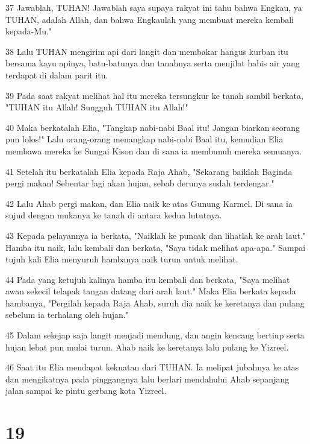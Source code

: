 \par 37 Jawablah, TUHAN! Jawablah saya supaya rakyat ini tahu bahwa Engkau, ya TUHAN, adalah Allah, dan bahwa Engkaulah yang membuat mereka kembali kepada-Mu."
\par 38 Lalu TUHAN mengirim api dari langit dan membakar hangus kurban itu bersama kayu apinya, batu-batunya dan tanahnya serta menjilat habis air yang terdapat di dalam parit itu.
\par 39 Pada saat rakyat melihat hal itu mereka tersungkur ke tanah sambil berkata, "TUHAN itu Allah! Sungguh TUHAN itu Allah!"
\par 40 Maka berkatalah Elia, "Tangkap nabi-nabi Baal itu! Jangan biarkan seorang pun lolos!" Lalu orang-orang menangkap nabi-nabi Baal itu, kemudian Elia membawa mereka ke Sungai Kison dan di sana ia membunuh mereka semuanya.
\par 41 Setelah itu berkatalah Elia kepada Raja Ahab, "Sekarang baiklah Baginda pergi makan! Sebentar lagi akan hujan, sebab derunya sudah terdengar."
\par 42 Lalu Ahab pergi makan, dan Elia naik ke atas Gunung Karmel. Di sana ia sujud dengan mukanya ke tanah di antara kedua lututnya.
\par 43 Kepada pelayannya ia berkata, "Naiklah ke puncak dan lihatlah ke arah laut." Hamba itu naik, lalu kembali dan berkata, "Saya tidak melihat apa-apa." Sampai tujuh kali Elia menyuruh hambanya naik turun untuk melihat.
\par 44 Pada yang ketujuh kalinya hamba itu kembali dan berkata, "Saya melihat awan sekecil telapak tangan datang dari arah laut." Maka Elia berkata kepada hambanya, "Pergilah kepada Raja Ahab, suruh dia naik ke keretanya dan pulang sebelum ia terhalang oleh hujan."
\par 45 Dalam sekejap saja langit menjadi mendung, dan angin kencang bertiup serta hujan lebat pun mulai turun. Ahab naik ke keretanya lalu pulang ke Yizreel.
\par 46 Saat itu Elia mendapat kekuatan dari TUHAN. Ia melipat jubahnya ke atas dan mengikatnya pada pinggangnya lalu berlari mendahului Ahab sepanjang jalan sampai ke pintu gerbang kota Yizreel.

\chapter{19}

